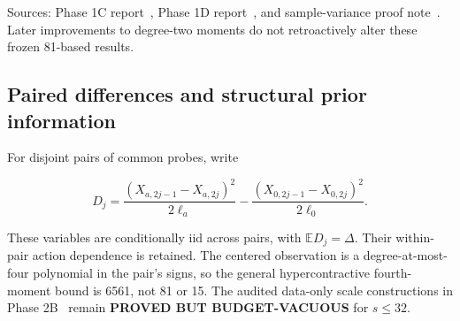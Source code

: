 Sources: Phase 1C report~\cite{project2026}, Phase 1D report~\cite{project2026}, and sample-variance proof note~\cite{project2026}. Later improvements to degree-two moments do not retroactively alter these frozen 81-based results.

\subsection{Paired differences and structural prior information}
For disjoint pairs of common probes, write


\begin{equation}
D_j=\frac{(X_{a,2j-1}-X_{a,2j})^2}{2\ell_a}
-\frac{(X_{0,2j-1}-X_{0,2j})^2}{2\ell_0}.
\end{equation}


These variables are conditionally iid across pairs, with $\mathbb ED_j=\Delta$. Their within-pair action dependence is retained. The centered observation is a degree-at-most-four polynomial in the pair's signs, so the general hypercontractive fourth-moment bound is 6561, not 81 or 15. The audited data-only scale constructions in Phase 2B~\cite{project2026} remain \textbf{PROVED BUT BUDGET-VACUOUS} for $s\le32$.

